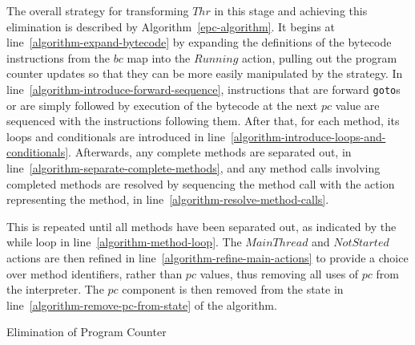 The overall strategy for transforming $Thr$ in this stage and
achieving this elimination is described by
Algorithm~\ref{epc-algorithm}.
It begins at line~\ref{algorithm-expand-bytecode} by expanding the
\Circus{} definitions of the bytecode instructions from the $bc$ map
into the $Running$ action, pulling out the program counter updates so
that they can be more easily manipulated by the strategy.
In line~\ref{algorithm-introduce-forward-sequence}, instructions that
are forward \texttt{goto}s or are simply followed by execution of the
bytecode at the next $pc$ value are sequenced with the instructions
following them.
After that, for each method, its loops and conditionals are introduced
in line~\ref{algorithm-introduce-loops-and-conditionals}. 
Afterwards, any complete methods are separated out, in
line~\ref{algorithm-separate-complete-methods}, and any method calls
involving completed methods are resolved by sequencing the method call
with the \Circus{} action representing the method, in
line~\ref{algorithm-resolve-method-calls}.

This is repeated until all methods have been separated out, as
indicated by the while loop in line~\ref{algorithm-method-loop}.
The $MainThread$ and $NotStarted$ actions are then refined in
line~\ref{algorithm-refine-main-actions} to provide a choice over
method identifiers, rather than $pc$ values, thus removing all uses of
$pc$ from the interpreter.
The $pc$ component is then removed from the state in
line~\ref{algorithm-remove-pc-from-state} of the algorithm.

\begin{algorithm}[t]
  \begin{algorithmic}[1]
    \State {} \label{algorithm-expand-bytecode}
    \State {} \label{algorithm-introduce-forward-sequence}
     \label{algorithm-method-loop}
    \State {} \label{algorithm-introduce-loops-and-conditionals}
    \State {} \label{algorithm-separate-complete-methods}
    \State {} \label{algorithm-resolve-method-calls}
    \EndWhile
    \State {} \label{algorithm-refine-main-actions}
    \State {} \label{algorithm-remove-pc-from-state}
  \end{algorithmic}
  \caption{Elimination of Program Counter}
  \label{epc-algorithm}
\end{algorithm}

